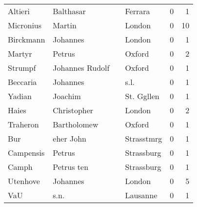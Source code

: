 \begin{center}
\begin{tiny}
\begin{longtabu}{llllrr}
                  Altieri &                          Balthasar &             &                                     Ferrara &          0 &         1 \\
                Micronius &                             Martin &             &                                      London &          0 &        10 \\
                Birckmann &                           Johannes &             &                                      London &          0 &         1 \\
                   Martyr &                             Petrus &             &                                      Oxford &          0 &         2 \\
                  Strumpf &                    Johannes Rudolf &             &                                      Oxford &          0 &         1 \\
                 Beccaria &                           Johannes &             &                                        s.l. &          0 &         1 \\
                   Yadian &                            Joachim &             &                                  St. Ggllen &          0 &         1 \\
                    Haies &                        Christopher &             &                                      London &          0 &         2 \\
                 Traheron &                        Bartholomew &             &                                      Oxford &          0 &         1 \\
                      Bur &                          eher John &             &                                  Strasstmrg &          0 &         1 \\
                Campensis &                             Petrus &             &                                  Strassburg &          0 &         1 \\
                    Camph &                         Petrus ten &             &                                  Strassburg &          0 &         1 \\
                 Utenhove &                           Johannes &             &                                      London &          0 &         5 \\
                      VaU &                               s.n. &             &                                    Lausanne &          0 &         1 \\

\end{longtabu}
\end{tiny}
\end{center}
